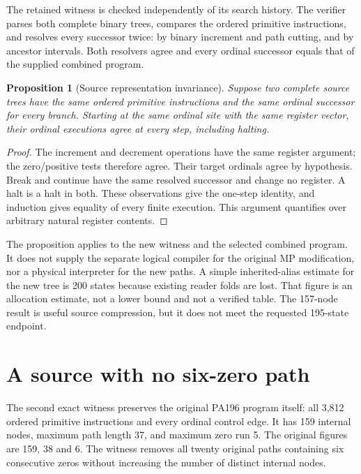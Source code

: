 \documentclass[11pt,letterpaper]{article}
\newtheorem{proposition}[theorem]{Proposition}
\begin{document}
The retained witness is checked independently of its search history. The
verifier parses both complete binary trees, compares the ordered primitive
instructions, and resolves every successor twice: by binary increment and
path cutting, and by ancestor intervals. Both resolvers agree and every
ordinal successor equals that of the supplied combined program.

\begin{proposition}[Source representation invariance]
Suppose two complete source trees have the same ordered primitive
instructions and the same ordinal successor for every branch. Starting
at the same ordinal site with the same register vector, their ordinal
executions agree at every step, including halting.
\end{proposition}
\begin{proof}
The increment and decrement operations have the same register argument;
the zero/positive tests therefore agree. Their target ordinals agree by
hypothesis. Break and continue have the same resolved successor and change
no register. A halt is a halt in both. These observations give the one-step
identity, and induction gives equality of every finite execution. This
argument quantifies over arbitrary natural register contents.
\end{proof}

The proposition applies to the new witness and the selected combined
program. It does not supply the separate logical compiler for the original
MP modification, nor a physical interpreter for the new paths. A simple
inherited-alias estimate for the new tree is 200 states because existing
reader folds are lost. That figure is an allocation estimate, not a lower
bound and not a verified table. The 157-node result is useful source
compression, but it does not meet the requested 195-state endpoint.

\section{A source with no six-zero path}

The second exact witness preserves the original PA196 program itself:
all 3,812 ordered primitive instructions and every ordinal control edge.
It has 159 internal nodes, maximum path length 37, and maximum zero run 5.
The original figures are 159, 38 and 6. The witness removes all twenty
original paths containing six consecutive zeros without increasing the
number of distinct internal nodes.
\end{document}
